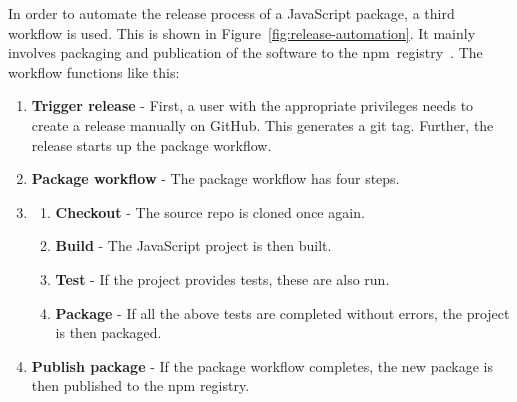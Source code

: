 In order to automate the release process of a JavaScript package, a third workflow is used. This is shown in Figure~\ref{fig:release-automation}. It mainly involves packaging and publication of the software to the npm~registry~\cite{npm-registry}. The workflow functions like this:
\begin{enumerate}
    \item \textbf{Trigger release} - First, a user with the appropriate privileges needs to create a release manually on GitHub. This generates a git tag. Further, the release starts up the package workflow.
    \item \textbf{Package workflow} - The package workflow has four steps.
    \item \begin{enumerate}
        \item \textbf{Checkout} - The source repo is cloned once again.
        \item \textbf{Build} - The JavaScript project is then built.
        \item \textbf{Test} - If the project provides tests, these are also run.
        \item \textbf{Package} - If all the above tests are completed without errors, the project is then packaged.
    \end{enumerate}
    \item \textbf{Publish package} - If the package workflow completes, the new package is then published to the npm registry.
\end{enumerate}

